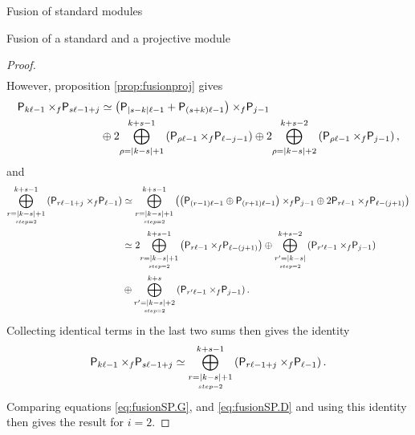 \documentclass[reqno]{amsart}
\newcommand{\dP}[1]{\mathsf P_{#1}}
\newcommand{\xf}{\times\hspace{-0.27em}_f}
\newcommand{\lc}{\ell}
\begin{document}
\begin{section}{Fusion of standard modules}
\begin{subsection}{Fusion of a standard and a projective module}
\begin{proof}
\begin{align}
\end{align}
However, proposition \ref{prop:fusionproj} gives
\begin{align}
\dP{k\lc -1} \xf \dP{s \lc -1+j} & \simeq \left(\dP{|s-k| \lc -1} + \dP{(s+k)\lc-1 }\right) \xf \dP{j-1} \notag \\
& \oplus 2\overset{k+s -1}{\underset{\rho = |k-s|+1}{\bigoplus}}\left(\dP{\rho \lc -1}\xf \dP{\lc - j -1}\right) \oplus 2\overset{k+s -2}{\underset{\rho = |k-s|+2}{\bigoplus}}\left(\dP{\rho \lc -1}\xf \dP{j-1} \right),
\end{align}
and
\begin{align}
\overset{k+s-1}{\underset{\underset{step =2}{r = |k-s| + 1}}{\bigoplus}}\left( \dP{r \lc -1+j} \xf  \dP{\lc -1} \right) &\simeq \overset{k+s-1}{\underset{\underset{step =2}{r = |k-s| + 1}}{\bigoplus}}\left( \left(\dP{(r-1)\lc -1} \oplus \dP{(r+1)\lc -1} \right)\xf \dP{j-1} \oplus 2 \dP{r \lc -1} \xf \dP{\lc - (j+1)}\right) \notag\\
& \simeq 2 \overset{k+s-1}{\underset{\underset{step =2}{r = |k-s| + 1}}{\bigoplus}}\left(\dP{r \lc -1} \xf \dP{\lc - (j+1)}\right) \oplus \overset{k+s-2}{\underset{\underset{step =2}{r' = |k-s|}}{\bigoplus}}\left(\dP{r'\lc -1}\xf \dP{j-1} \right) \notag\\
& \oplus \overset{k+s}{\underset{\underset{step =2}{r' = |k-s| + 2}}{\bigoplus}}\left(\dP{r'\lc -1}\xf \dP{j-1} \right).
\end{align}
Collecting identical terms in the last two sums then gives the identity
\begin{equation}
\dP{k\lc -1} \xf \dP{s \lc -1+j} \simeq \overset{k+s-1}{\underset{\underset{step =2}{r = |k-s| + 1}}{\bigoplus}}\left( \dP{r \lc -1+j} \xf  \dP{\lc -1} \right).
\end{equation}
Comparing equations \eqref{eq:fusionSP.G}, and \eqref{eq:fusionSP.D} and using this identity then gives the result for $i=2$. 


\end{proof}
\end{subsection}
\end{section}
\end{document}
